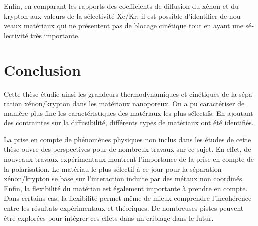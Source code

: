 \documentclass[thesis]{subfiles}
\begin{document}
\begin{otherlanguage}{french}
Enfin, en comparant les rapports des coefficients de diffusion du xénon et du krypton aux valeurs de la sélectivité Xe/Kr, il est possible d'identifier de nouveaux matériaux qui ne présentent pas de blocage cinétique tout en ayant une sélectivité très importante.

\section*{Conclusion}

Cette thèse étudie ainsi les grandeurs thermodynamiques et cinétiques de la séparation xénon/krypton dans les matériaux nanoporeux. On a pu caractériser de manière plus fine les caractéristiques des matériaux les plus sélectifs. En ajoutant des contraintes sur la diffusibilité, différents types de matériaux ont été identifiés. 

La prise en compte de phénomènes physiques non inclus dans les études de cette thèse ouvre des perspectives pour de nombreux travaux sur ce sujet. En effet, de nouveaux travaux expérimentaux montrent l'importance de la prise en compte de la polarisation. Le matériau le plus sélectif à ce jour pour la séparation xénon/krypton se base sur l'interaction induite par des métaux non coordinés.\autocite{Pei_2022} Enfin, la flexibilité du matériau est également importante à prendre en compte. Dans certains cas, la flexibilité permet même de mieux comprendre l'incohérence entre les résultats expérimentaux et théoriques. De nombreuses pistes peuvent être explorées pour intégrer ces effets dans un criblage dans le futur.\autocite{Lachet_1998,Witman_2017}

\vfill
\begin{center}
\end{center}
\vfill\vfill

\end{otherlanguage}

\OnlyInSubfile{\printglobalbibliography}
\end{document}
